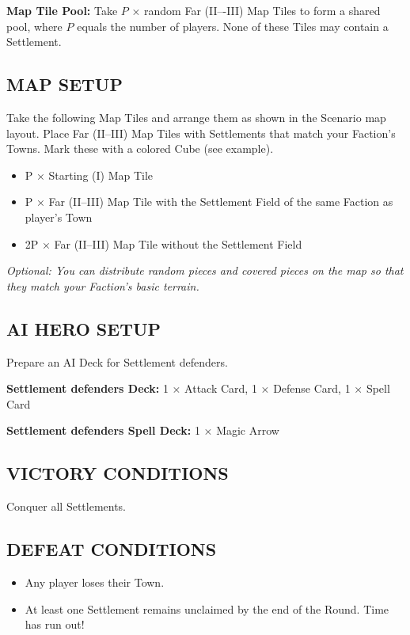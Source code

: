 \begin{multicols}{2}
\textbf{Map Tile Pool:} Take $P$ × random Far (II–-III) Map Tiles to form a shared pool, where $P$ equals the number of players. None of these Tiles may contain a Settlement.

\subsection*{\MakeUppercase{Map Setup}}

Take the following Map Tiles and arrange them as shown in the Scenario map layout.
Place Far (II--III) Map Tiles with Settlements that match your Faction's Towns. Mark these with a colored Cube (see example).

\begin{itemize}
  \item P × Starting (I) Map Tile
  \item P × Far (II--III) Map Tile with the Settlement Field of the same Faction as player's Town
  \item 2P × Far (II--III) Map Tile without the Settlement Field
\end{itemize}

\textit{Optional: You can distribute random pieces and covered pieces on the map so that they match your Faction's basic terrain.}

\subsection*{\MakeUppercase{AI Hero Setup}}

Prepare an AI Deck for Settlement defenders.

\textbf{Settlement defenders Deck:} 1 × Attack Card, 1 × Defense Card, 1 × Spell Card

\textbf{Settlement defenders Spell Deck:} 1 × Magic Arrow

\subsection*{\MakeUppercase{Victory Conditions}}
Conquer all Settlements.

\subsection*{\MakeUppercase{Defeat Conditions}}

\begin{itemize}
  \item Any player loses their Town.
  \item At least one Settlement remains unclaimed by the end of the  Round. Time has run out!
\end{itemize}


\end{multicols}
